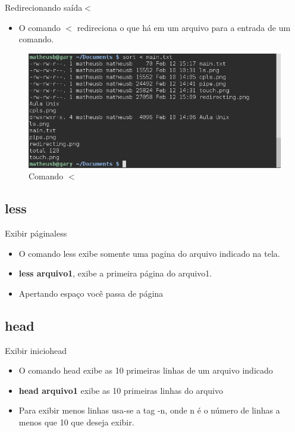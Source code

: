 \documentclass{beamer}
\begin{document}
\begin{frame}{Redirecionando saída}{$<$}
  \begin{itemize}
  \item { O comando $<$ redireciona o que há em um arquivo para a entrada de um comando.
    }\end{itemize}
          \begin{figure}[h!]
        \centering
        \includegraphics[scale=0.3]{directing.png}
        \caption{Comando $<$}
        \label{fig:Comando <}
    \end{figure}
\end{frame}

\subsection{less}
\begin{frame}{Exibir página}{less}
  \begin{itemize}
  \item {
   O comando less exibe somente uma pagina do arquivo indicado na tela.
    } 
    \item{ \textbf{less arquivo1}, exibe a primeira página do arquivo1.}
    \item{Apertando espaço você passa de página
  }
  \end{itemize}
\end{frame}

\subsection{head}
\begin{frame}{Exibir inicio}{head}
  \begin{itemize}
  \item {
O comando head exibe as 10 primeiras linhas de um arquivo indicado
} 
    \item{ \textbf{head arquivo1} exibe as 10 primeiras linhas do arquivo}
    \item{Para exibir menos linhas usa-se a tag -n, onde n é o número de linhas a menos que 10 que deseja exibir.
  }
 
  \end{itemize}
\end{frame}
\end{document}
